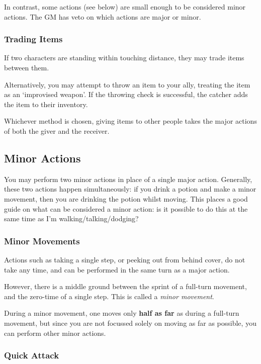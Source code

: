 In contrast, some actions (see below) are small enough to be considered minor actions. The GM has veto on which actions are major or minor. 

\subsubsection{Trading Items}

If two characters are standing within touching distance, they may trade items between them. 

Alternatively, you may attempt to throw an item to your ally, treating the item as an `improvised weapon'. If the throwing check is successful, the catcher adds the item to their inventory. 

Whichever method is chosen, giving items to other people takes the major actions of both the giver and the receiver. 


\subsection{Minor Actions}
You may perform two minor actions in place of a single major action. Generally, these two actions happen simultaneously: if you drink a potion and make a minor movement, then you are drinking the potion whilst moving. This places a good guide on what can be considered a minor action: is it possible to do this at the same time as I'm walking/talking/dodging? 

\subsubsection{Minor Movements}

Actions such as taking a single step, or peeking out from behind cover, do not take any time, and can be performed in the same turn as a major action. 

However, there is a middle ground between the sprint of a full-turn movement, and the zero-time of a single step. This is called a {\it minor movement}. 

During a minor movement, one moves only {\bf half as far} as during a full-turn movement, but since you are not focussed solely on moving as far as possible, you can perform other minor actions. 

\subsubsection{Quick Attack}

